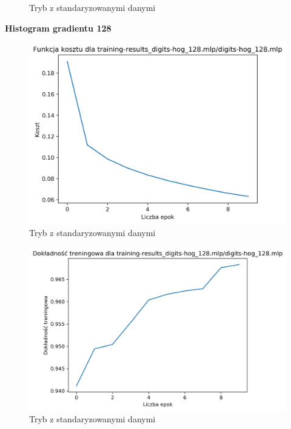 \documentclass{classrep}
\begin{document}
{{{\begin{figure}[!htbp]
                    \caption{Tryb z standaryzowanymi danymi}
                \end{figure}
                \FloatBarrier
                \textbf{Histogram gradientu 128}
                \begin{figure}[!htbp]
                    \centering
                    \includegraphics[width=145mm]{wykresy/digits-hog_128_mlp_cost.png}
                    \caption{Tryb z standaryzowanymi danymi}
                \end{figure}
                \begin{figure}[!htbp]
                    \centering
                    \includegraphics[width=145mm]{wykresy/digits-hog_128_mlp_training-accuracy.png}
                    \caption{Tryb z standaryzowanymi danymi}
                \end{figure}
}}}
\end{document}
